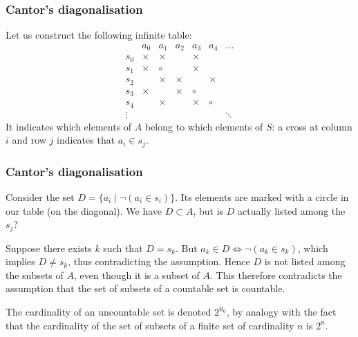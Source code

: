 \documentclass[compress,dvipdfmx]{beamer}
\begin{document}
%
\begin{frame}
\frametitle{Cantor's diagonalisation}

Let us construct the following infinite table:
\[
\begin{array}{c|cccccc}
       & a_0    & a_1    & a_2    & a_3   & a_4      & \ldots\\
\hline
s_0    & \times & \times &        & \times \\
s_1    & \times & \circ  &        & \times \\
s_2    &        & \times & \times &        & \times\\
s_3    & \times &        & \times & \circ  & \\
s_4    &        & \times &        & \times & \circ\\
\vdots &        &        &        &        &         & \ddots
\end{array}
\]
It indicates which elements of $A$ belong to which elements of $S$:
a cross at column $i$ and row $j$ indicates that $a_i \in s_j$.

\end{frame}

%
\begin{frame}
\frametitle{Cantor's diagonalisation}

Consider the set $D = \{a_i \mid \neg(a_i \in s_i)\}$. Its elements
are marked with a circle in our table (on the diagonal). We have
$D \subset A$, but is $D$ actually listed among the $s_j$?

\bigskip

Suppose there exists $k$ such that $D = s_k$. But $a_k \in D
\Leftrightarrow \neg(a_k \in s_k)$, which implies $D \neq s_k$,
thus contradicting the assumption. Hence $D$ is not listed among the
subsets of $A$, even though it is a subset of $A$. This therefore
contradicts the assumption that the set of subsets of a countable
set is countable.

\bigskip

The cardinality of an uncountable set is denoted $2^{\aleph_0}$, by
analogy with the fact that the cardinality of the set of subsets of
a finite set of cardinality $n$ is $2^n$.

\end{frame}
\end{document}
